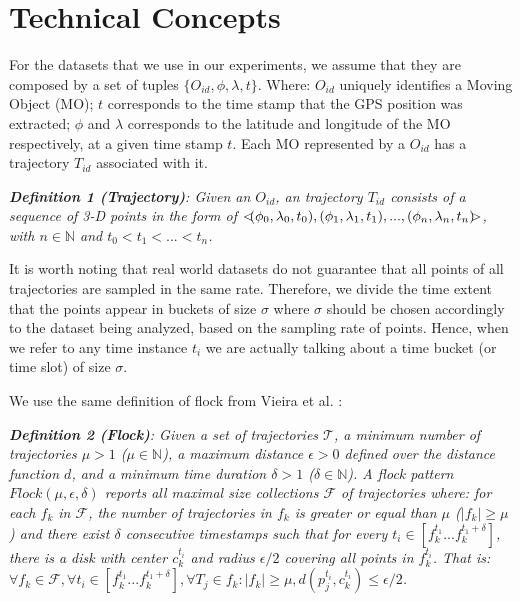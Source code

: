 \chapter{Technical Concepts}
\label{chp:techconcepts}
For the datasets that we use in our experiments, we assume that they are composed by a set of tuples $\{O_{id}, \phi,
\lambda, t\}$.  Where: $O_{id}$ uniquely identifies a Moving Object (MO); $t$ corresponds to the time stamp that the GPS
position was extracted; $\phi$ and $\lambda$ corresponds to the latitude and longitude of the MO respectively, at a
given time stamp $t$. Each MO represented by a $O_{id}$ has a trajectory $T_{id}$ associated with it.

\noindent
\textit{\textbf{Definition 1 (Trajectory)}: Given an $O_{id}$, an trajectory $T_{id}$ consists of a sequence of 3-D
points in the form of $<\hspace{-0.2cm}(\phi_0, \lambda_0, t_0), (\phi_1, \lambda_1, t_1), ..., (\phi_n, \lambda_n, t_n)
\hspace{-0.2cm}>$, with $n \in \mathbb{N}$ and $t_0 < t_1 < ... < t_n$.}

It is worth noting that real world datasets do not guarantee that all points of all trajectories are sampled in the same
rate. Therefore, we divide the time extent that the points appear in buckets of size $\sigma$ where $\sigma$ should be
chosen accordingly to the dataset being analyzed, based on the sampling rate of points. Hence, when we refer to any time
instance $t_i$ we are actually talking about a time bucket (or time slot) of size $\sigma$.

We use the same definition of flock from Vieira et al. \citep{vieira}:

\noindent
\textit{\textbf{Definition 2 (Flock)}: Given a set of trajectories $\mathcal{T}$, a minimum number of trajectories $\mu
> 1$ ($\mu \in \mathbb{N}$), a maximum distance $\epsilon > 0$ defined over the distance function $d$, and a minimum
time duration $\delta > 1$ ($\delta \in \mathbb{N}$). A flock pattern $Flock (\mu, \epsilon, \delta)$ reports all
maximal size collections $\mathcal{F}$ of trajectories where: for each $f_k$ in $\mathcal{F}$, the number of
trajectories in $f_k$ is greater or equal than $\mu$ ($|f_k| \ge \mu$) and there exist $\delta$ consecutive timestamps
such that for every $t_i \in [f_k^{t_1}...f_k^{t_1 + \delta}]$, there is a disk with center $c_k^{t_i}$ and radius
$\epsilon/2$ covering all points in $f_k^{t_i}$. That is: $\forall f_k \in \mathcal{F}, \forall t_i \in
[f_k^{t_1}...f_k^{t_1 + \delta}], \forall T_j \in f_k: |f_k | \ge \mu, d(p_j^{t_i},c_k^{t_i}) \le \epsilon/2$.}
